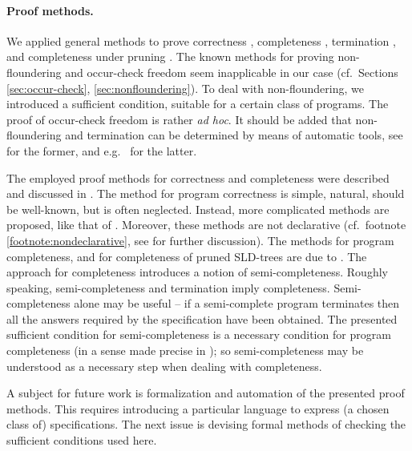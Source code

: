 \documentclass{tlp}
\begin{document}
\paragraph{Proof methods.}
We applied general methods to prove correctness  \cite{Clark79},
completeness \cite{drabent.tocl16}, termination \cite{DBLP:journals/jlp/Bezem93},
and completeness under pruning  \cite{drabent.tocl16}.
The known methods for proving non-floundering and occur-check freedom seem
inapplicable in our case
(cf.\ Sections \ref{sec:occur-check}, \ref{sec:nonfloundering}).
To deal with non-floundering,
we introduced a sufficient condition, suitable for a certain class of programs.
The proof of occur-check freedom is rather {\em ad hoc}.
It should be added that non-floundering and termination can be
determined by means of automatic tools, see
\cite{king.non-suspension2008} for the former,
and e.g.\ \cite[and the references therein]{NguyenSGS11-termination-shorter} 
for the latter.
{\sloppy\par}




The employed proof methods for correctness and completeness were described
and discussed in \cite{drabent.tocl16}.
The method for program correctness  \cite{Clark79} is simple, natural,
  should be well-known, but is often neglected.
  Instead, more complicated methods are proposed, like that of
  \cite{Apt-Prolog}. 
  Moreover, these methods are not declarative
  (cf.\ footnote \ref{footnote:nondeclarative}, see
  \cite{DBLP:journals/tplp/DrabentM05shorter,drabent.tocl16}
  for further discussion).
The methods for program completeness, and 
for completeness of pruned SLD-trees are due to \cite{drabent.tocl16}.
  The approach for completeness introduces a notion of semi-completeness.
  Roughly speaking, semi-completeness and termination imply completeness.
Semi-completeness alone may be useful -- if a semi-complete program
terminates then all the answers required by the
  specification have been obtained.
  The presented sufficient condition for semi-completeness
  is a necessary condition for program completeness
  (in a sense made precise in  \cite{drabent.tocl16});
  so semi-completeness may be understood as a necessary step when dealing
  with completeness.


A subject for future work is formalization and automation of the presented
proof methods.  This requires introducing a particular language to
express (a chosen class of) specifications.  The next issue is devising
formal methods of checking the sufficient conditions used here.
\end{document}
